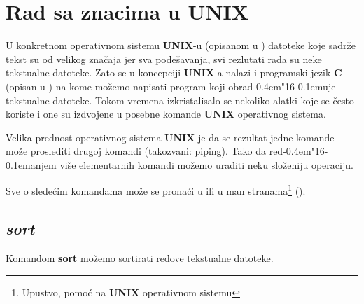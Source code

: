 \documentclass[12pt,a4paper,titlepage]{article}
\def\d{d\kern-0.4em\char"16\kern-0.1em}
\begin{document}
  \section{Rad sa znacima u {\bf UNIX}}
    U konkretnom operativnom sistemu {\bf UNIX}-u (opisanom u \cite{UNIX})
    datoteke koje sadr\v ze tekst su od velikog zna\v caja jer sva
    pode\v savanja, svi rezlutati rada su neke tekstualne datoteke.
    Zato se u koncepciji {\bf UNIX}-a nalazi i programski jezik {\bf C}
    (opisan u \cite{KR}) na kome mo\v zemo napisati program koji obra\d uje
    tekstualne datoteke.
    Tokom vremena izkristalisalo se nekoliko alatki koje se \v cesto koriste i
    one su izdvojene u posebne komande {\bf UNIX} operativnog sistema.

    Velika prednost operativnog sistema {\bf UNIX} je da se rezultat jedne
    komande mo\v ze proslediti drugoj komandi (takozvani: piping).
    Tako da re\d anjem vi\v se elementarnih komandi mo\v zemo uraditi neku
    slo\v zeniju operaciju.

    Sve o slede\'cim komandama mo\v ze se prona\'ci u \cite{UNIX} ili u man
    stranama\footnote{Upustvo, pomo\'c na {\bf UNIX} operativnom sistemu}
    (\cite{MAN}).
%
    \subsection{\em sort}
      Komandom {\bf sort} mo\v zemo sortirati redove tekstualne datoteke.
%
\end{document}
